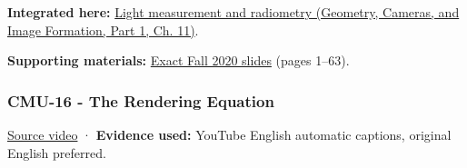 \textbf{Integrated here:} \href{../03-Geometry-Cameras-and-Image-Formation-P01/main.pdf\#03-visual-computing-i-ch004-light-measurement-and-radiometry}{Light measurement and radiometry (Geometry, Cameras, and Image Formation, Part 1, Ch. 11)}.

\textbf{Supporting materials:} \href{https://15462.courses.cs.cmu.edu/fall2020content/lectures/15_radiometry/15_radiometry_slides.pdf}{Exact Fall 2020 slides} (pages 1--63).

\subsubsection{CMU-16 - The Rendering Equation}\label{04-visual-computing-ii-ch036-cmu-16---the-rendering-equation}

\hypertarget{04-visual-computing-ii-ch036-cmu-16---the-rendering-equation}{}

\href{https://www.youtube.com/watch?v=Ttxdbn7TSLI}{Source video} · \textbf{Evidence used:} YouTube English automatic captions, original English preferred.

